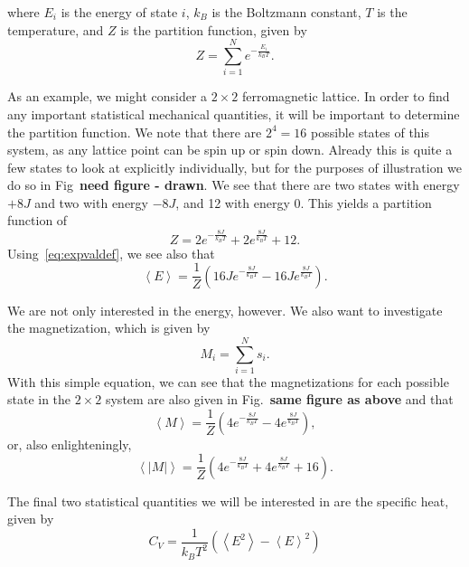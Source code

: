 \documentclass[12pt]{article}
\numberwithin{equation}{section}
\begin{document}
where $E_{i}$ is the energy of state $i$, $k_{B}$ is the Boltzmann constant, $T$ is the temperature, and $Z$ is the partition function, given by
\begin{equation}
\label{eq:partition}
Z=\sum_{i=1}^{N}e^{-\frac{E_{i}}{k_{B}T}}.
\end{equation}
\par As an example, we might consider a $2\times2$ ferromagnetic lattice.  In order to find any important statistical mechanical quantities, it will be important to determine the partition function.  We note that there are $2^{4}=16$ possible states of this system, as any lattice point can be spin up or spin down.  Already this is quite a few states to look at explicitly individually, but for the purposes of illustration we do so in Fig~\textbf{need figure - drawn}.  We see that there are two states with energy $+8J$ and two with energy $-8J$, and 12 with energy $0$.  This yields a partition function of
\begin{equation}
\label{eq:partition2x2}
Z=2e^{-\frac{8J}{k_{B}T}}+2e^{\frac{8J}{k_{B}T}}+12.
\end{equation}
Using~\eqref{eq:expvaldef}, we see also that
\begin{equation}
\label{eq:expe2x2}
\left<E\right> = \frac{1}{Z}\left(16Je^{-\frac{8J}{k_{B}T}}-16Je^{\frac{8J}{k_{B}T}}\right).
\end{equation}
\par We are not only interested in the energy, however.  We also want to investigate the magnetization, which is given by
\begin{equation}
\label{eq:mag}
M_{i}=\sum_{i=1}^{N}s_{i}.
\end{equation}
With this simple equation, we can see that the magnetizations for each possible state in the $2\times2$ system are also given in Fig.~\textbf{same figure as above} and that
\begin{equation}
\label{eq:expm2x2}
\left<M\right>=\frac{1}{Z}\left(4e^{-\frac{8J}{k_{B}T}}-4e^{\frac{8J}{k_{B}T}}\right),
\end{equation}
or, also enlighteningly,
\begin{equation}
\label{eq:expabsm2x2}
\left<\left|M\right|\right> = \frac{1}{Z}\left(4e^{-\frac{8J}{k_{B}T}}+4e^{\frac{8J}{k_{B}T}}+16\right).
\end{equation}
\par The final two statistical quantities we will be interested in are the specific heat, given by
\begin{equation}
\label{eq:cvdef}
C_{V} = \frac{1}{k_{B}T^{2}}\left(\left<E^{2}\right>-\left<E\right>^{2}\right)
\end{equation}
\end{document}
